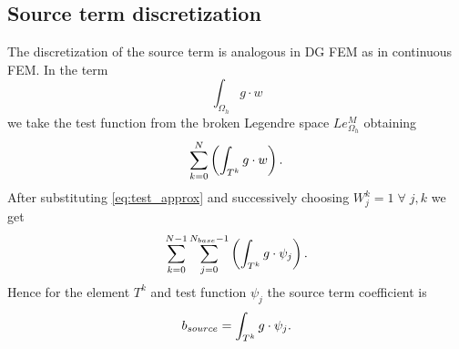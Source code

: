 \subsection{Source term discretization}
\label{se:source_term}
The discretization of the source term is analogous in DG FEM as in continuous
FEM. In the term
\begin{equation}
\int_{\Omega_h} g\cdot w
\end{equation}
we take the test function from the broken Legendre space $Le_{\Omega_h}^M$ obtaining
\begin{equation}
\sum\limits_{k=0}^{N}\left(\int_{T^k} g\cdot w\right).
\end{equation}
After substituting \eqref{eq:test_approx} and successively choosing $W_j^k = 1 \; \forall \;
j, k$ we get
\begin{equation}
\sum\limits_{k=0}^{N - 1}\sum\limits_{j=0}^{N_{base} - 1}\left(\int_{T^k} g\cdot
\psi_j \right).
\end{equation}
Hence for the element $T^k$ and test function $\psi_j$ the source term coefficient is
\begin{equation}
b_{source} = \int_{T^k} g\cdot \psi_j.
\end{equation}

\newpage
